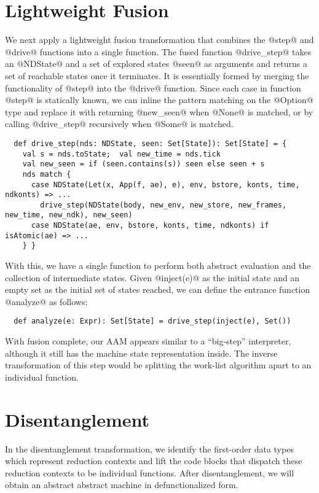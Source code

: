 \documentclass[acmsmall, screen]{acmart}\settopmatter{}
\begin{document}
\section{Lightweight Fusion} \label{fusing}

We next apply a lightweight fusion transformation that combines the @step@ and @drive@
functions into a single function.
The fused function @drive_step@ takes an @NDState@ and a set of explored states @seen@
as arguments and returns a set of reachable states once it terminates.
It is essentially formed by merging the functionality of @step@ into the @drive@ function.
Since each case in function @step@ is statically known, we can inline the pattern matching on the
@Option@ type and replace it with returning @new_seen@ when @None@ is matched, or by calling
@drive_step@ recursively when @Some@ is matched.

\begin{lstlisting}
  def drive_step(nds: NDState, seen: Set[State]): Set[State] = {
    val s = nds.toState;  val new_time = nds.tick
    val new_seen = if (seen.contains(s)) seen else seen + s
    nds match {
      case NDState(Let(x, App(f, ae), e), env, bstore, konts, time, ndkonts) => ...
        drive_step(NDState(body, new_env, new_store, new_frames, new_time, new_ndk), new_seen)
      case NDState(ae, env, bstore, konts, time, ndkonts) if isAtomic(ae) => ...
    } }
\end{lstlisting}

With this, we have a single function to perform both abstract evaluation and the collection of
intermediate states. Given @inject(e)@ as the initial state and an empty set as the
initial set of states reached, we can define the entrance function @analyze@ as follows:

\begin{lstlisting}
  def analyze(e: Expr): Set[State] = drive_step(inject(e), Set())
\end{lstlisting}

With fusion complete, our AAM appears similar to a ``big-step'' interpreter, although it
still has the machine state representation inside. The inverse transformation of this step
would be splitting the work-list algorithm apart to an individual function.

\section{Disentanglement} \label{disen}

In the disentanglement transformation, we identify the first-order data types which represent
reduction contexts and lift the code blocks that dispatch these reduction contexts to be individual
functions.
After disentanglement, we will obtain an abstract abstract machine in defunctionalized form.
\end{document}
